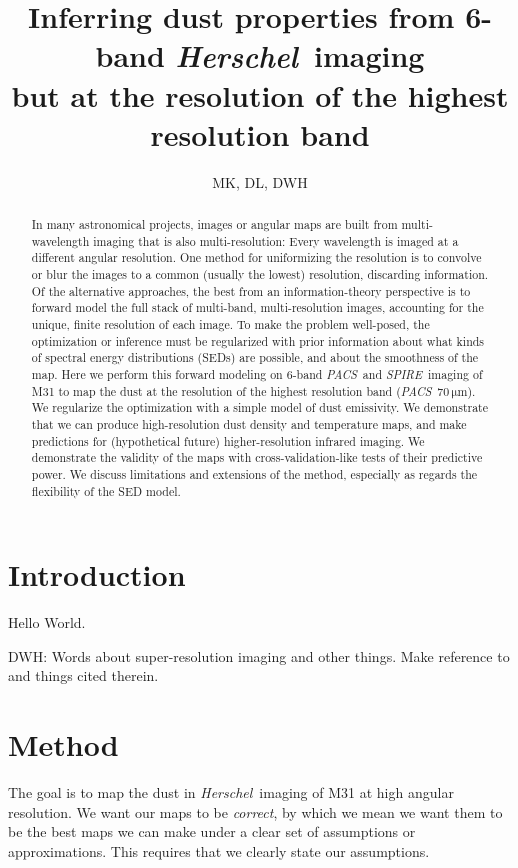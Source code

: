 \documentclass[12pt, preprint]{aastex}
\newcommand{\project}[1]{\textsl{#1}}
\newcommand{\Herschel}{\project{Herschel}}
\newcommand{\acronym}[1]{{\small{#1}}}
\newcommand{\PACS}{\project{\acronym{PACS}}}
\newcommand{\SPIRE}{\project{\acronym{SPIRE}}}
\newcommand{\unit}[1]{{\mathrm{#1}}}
\newcommand{\mum}{\unit{\mu m}}
\begin{document}
\title{Inferring dust properties from 6-band \Herschel\ imaging \\ 
       but at the resolution of the highest resolution band}
\author{MK, DL, DWH}

\begin{abstract}
In many astronomical projects, images or angular maps are built from
multi-wavelength imaging that is also multi-resolution:
Every wavelength is imaged at a different angular resolution.
One method for uniformizing the resolution is to convolve or blur the
images to a common (usually the lowest) resolution, discarding
information.
Of the alternative approaches, the best from an information-theory
perspective is to forward model the full stack of multi-band,
multi-resolution images, accounting for the unique, finite resolution
of each image.
To make the problem well-posed, the optimization or inference must be
regularized with prior information about what kinds of spectral energy
distributions (\acronym{SED}s) are possible, and about the smoothness of the map.
Here we perform this forward modeling on 6-band \PACS\ and
\SPIRE\ imaging of M31 to map the dust at the resolution of the
highest resolution band (\PACS~$70\,\mum$).
We regularize the optimization with a simple model of dust emissivity.
We demonstrate that we can produce high-resolution dust density and
temperature maps, and make predictions for (hypothetical future)
higher-resolution infrared imaging.
We demonstrate the validity of the maps with cross-validation-like
tests of their predictive power.
We discuss limitations and extensions of the method, especially as
regards the flexibility of the \acronym{SED} model.
\end{abstract}

\section{Introduction}

Hello World.

DWH: Words about super-resolution imaging and other things.  Make
reference to \citet{orieux} and things cited therein.

\section{Method}

The goal is to map the dust in \Herschel\ imaging of M31 at high
angular resolution.
We want our maps to be \emph{correct}, by which we mean we want them
to be the best maps we can make under a clear set of assumptions or
approximations.
This requires that we clearly state our assumptions.
\end{document}
